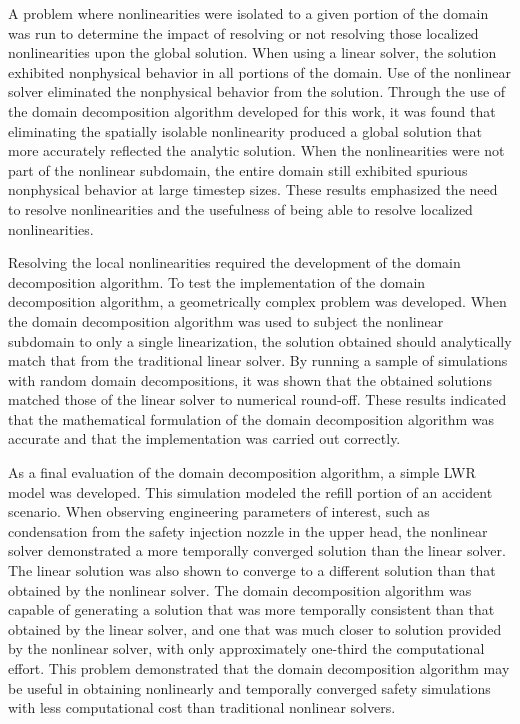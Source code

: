 A problem where nonlinearities were isolated to a given portion of the domain was run to determine the impact of resolving or not resolving those localized nonlinearities upon the global solution.
When using a linear solver, the solution exhibited nonphysical behavior in all portions of the domain.
Use of the nonlinear solver eliminated the nonphysical behavior from the solution.
Through the use of the domain decomposition algorithm developed for this work, it was found that eliminating the spatially isolable nonlinearity produced a global solution that more accurately reflected the analytic solution.
When the nonlinearities were not part of the nonlinear subdomain, the entire domain still exhibited spurious nonphysical behavior at large timestep sizes.
These results emphasized the need to resolve nonlinearities and the usefulness of being able to resolve localized nonlinearities.

Resolving the local nonlinearities required the development of the domain decomposition algorithm. 
To test the implementation of the domain decomposition algorithm, a geometrically complex problem was developed.
When the domain decomposition algorithm was used to subject the nonlinear subdomain to only a single linearization, the solution obtained should analytically match that from the traditional linear solver.
By running a sample of simulations with random domain decompositions, it was shown that the obtained solutions matched those of the linear solver to numerical round-off.
These results indicated that the mathematical formulation of the domain decomposition algorithm was accurate and that the implementation was carried out correctly.

As a final evaluation of the domain decomposition algorithm, a simple LWR model was developed.
This simulation modeled the refill portion of an accident scenario.
When observing engineering parameters of interest, such as condensation from the safety injection nozzle in the upper head, the nonlinear solver demonstrated a more temporally converged solution than the linear solver.
The linear solution was also shown to converge to a different solution than that obtained by the nonlinear solver.
The domain decomposition algorithm was capable of generating a solution that was more temporally consistent than that obtained by the linear solver, and one that was much closer to solution provided by the nonlinear solver, with only approximately one-third the computational effort.
This problem demonstrated that the domain decomposition algorithm may be useful in obtaining nonlinearly and temporally converged safety simulations with less computational cost than traditional nonlinear solvers.

